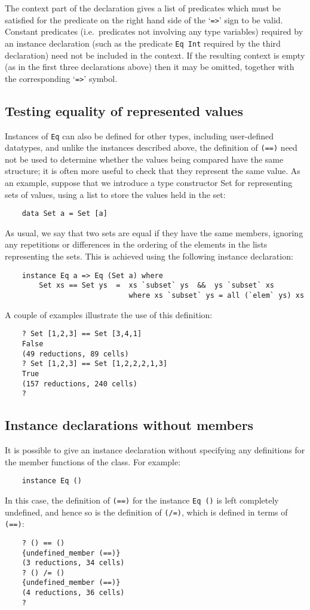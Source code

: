 The context part of the declaration gives a list  of  predicates  which
must be satisfied for the predicate on the right hand side of the  `\verb"=>"'
sign to be valid.  Constant predicates (i.e.\ predicates  not  involving
any type variables) required by an instance declaration  (such  as  the
predicate \verb"Eq Int"  required  by  the  third  declaration)  need  not  be
included in the context.  If the resulting context is empty (as in  the
first three declarations above) then it may be omitted,  together  with
the corresponding `\verb"=>"' symbol.


\subsection{Testing equality of represented values}
Instances of  \verb"Eq"  can  also  be  defined  for  other  types,  including
user-defined datatypes, and unlike the instances described  above,  the
definition of \verb"(==)" need not be used to  determine  whether  the  values
being compared have the same structure; it  is  often  more  useful  to
check that they represent the same value.  As an example, suppose  that
we introduce a type constructor Set for representing  sets  of  values,
using a list to store the values held in the set:
\begin{verbatim}
    data Set a = Set [a]
\end{verbatim}
As usual, we say that two sets are equal if they have the same members,
ignoring any repetitions or differences in the ordering of the elements
in the lists  representing  the  sets.   This  is  achieved  using  the
following instance declaration:
\begin{verbatim}
    instance Eq a => Eq (Set a) where
        Set xs == Set ys  =  xs `subset` ys  &&  ys `subset` xs
                             where xs `subset` ys = all (`elem` ys) xs
\end{verbatim}
A couple of examples illustrate the use of this definition:
\begin{verbatim}
    ? Set [1,2,3] == Set [3,4,1]
    False
    (49 reductions, 89 cells)
    ? Set [1,2,3] == Set [1,2,2,2,1,3]
    True
    (157 reductions, 240 cells)
    ? 
\end{verbatim}

\subsection{Instance declarations without members}
It is possible to give an instance declaration without  specifying  any
definitions for the member functions of the class.  For example:
\begin{verbatim}
    instance Eq ()
\end{verbatim}
In this case, the definition of  \verb"(==)" for the instance  \verb"Eq ()"  
is  left
completely undefined, and hence so is the definition of \verb"(/=)", which  is
defined in terms of \verb"(==)":
\begin{verbatim}
    ? () == ()
    {undefined_member (==)}
    (3 reductions, 34 cells)
    ? () /= ()
    {undefined_member (==)}
    (4 reductions, 36 cells)
    ? 
\end{verbatim}

